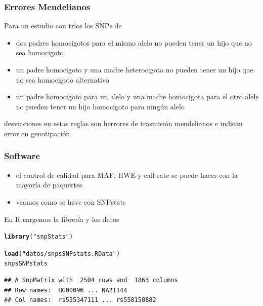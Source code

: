 \documentclass{beamer}\usepackage[]{graphicx}\usepackage[]{color}
\makeatletter
\newcommand{\hlstr}[1]{\textcolor[rgb]{0.192,0.494,0.8}{#1}}%
\newcommand{\hlstd}[1]{\textcolor[rgb]{0.345,0.345,0.345}{#1}}%
\newcommand{\hlkwd}[1]{\textcolor[rgb]{0.737,0.353,0.396}{\textbf{#1}}}%
\newenvironment{kframe}{%
 \def\at@end@of@kframe{}%
 \ifinner\ifhmode%
  \def\at@end@of@kframe{\end{minipage}}%
  \begin{minipage}{\columnwidth}%
 \fi\fi%
 \def\FrameCommand##1{\hskip\@totalleftmargin \hskip-\fboxsep
 \colorbox{shadecolor}{##1}\hskip-\fboxsep
     \hskip-\linewidth \hskip-\@totalleftmargin \hskip\columnwidth}%
 \MakeFramed {\advance\hsize-\width
   \@totalleftmargin\z@ \linewidth\hsize
   \@setminipage}}%
 {\par\unskip\endMakeFramed%
 \at@end@of@kframe}
\newenvironment{knitrout}{}{} %
\makeatother
\begin{document}
\begin{frame}[fragile]
\frametitle{Errores Mendelianos}
Para un estudio con trios los SNPs de 
\begin{itemize}
\item dos padres homocigotos para el mismo alelo no pueden tener un hijo que no sea homocigoto
\item un padre homocigoto y una madre heterocigota no pueden tener un hijo que no sea homocigoto alternativo
\item un padre homocigoto para un alelo y una madre homocigota para el otro alele no pueden tener un hijo homocigoto para ning\'un alelo 
\end{itemize}

desviaciones en estas reglas son herrores de trasmisi\'on mendelianos e indican error en genotipaci\'on

\end{frame}



\begin{frame}[fragile]
\frametitle{Software}

\begin{itemize}
\item el control de calidad para MAF, HWE y call-rate se puede hacer con la mayor\'ia de paquertes
\item veamos como se have con SNPstats
\end{itemize}

En R cargemos la librer\'ia y los datos
\begin{knitrout}\footnotesize
{}\color{fgcolor}\begin{kframe}
\begin{alltt}
\hlkwd{library}\hlstd{(}\hlstr{"snpStats"}\hlstd{)}
\end{alltt}


{\ttfamily\noindent\itshape\color{messagecolor}{\#\# Loading required package: survival}}

{\ttfamily\noindent\itshape\color{messagecolor}{\#\# Loading required package: Matrix}}\begin{alltt}
\hlkwd{load}\hlstd{(}\hlstr{"datos/snpsSNPstats.RData"}\hlstd{)}
\hlstd{snpsSNPstats}
\end{alltt}
\begin{verbatim}
## A SnpMatrix with  2504 rows and  1863 columns
## Row names:  HG00096 ... NA21144 
## Col names:  rs555347111 ... rs558158882
\end{verbatim}
\end{kframe}
\end{knitrout}
\end{frame}
\end{document}
